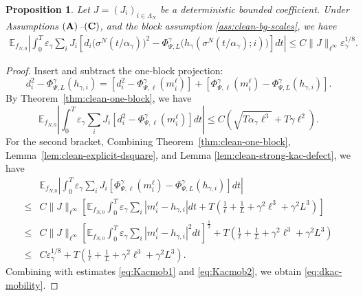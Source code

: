 \documentclass{article}
\newtheorem{proposition}[theorem]{Proposition}
\begin{document}
\begin{proposition}
\label{prop:deterministic-microscopic-to-kac-mobility-main}
Let \(J=(J_i)_{i\in\Lambda_N}\) be a deterministic bounded coefficient. 
Under Assumptions \(({\bf A})\)--\(({\bf C})\), and the block assumption \eqref{ass:clean-bg-scales}, we have
\begin{align}\label{eq:dkac-mobility}
    \mathbb E_{f_{N,0}} \left|\int_0^T \varepsilon_\gamma\sum_i
J_i\left[d_i\bigl(\sigma^N(t/\alpha_\gamma)\bigr)^2 - \Phi_{\Psi,L}^{\gamma}
\bigl(h_\gamma(\sigma^N(t/\alpha_\gamma);i)\bigr)\right]dt \right| \le C\|J\|_{\ell^\infty}\varepsilon^{1/8}_{\gamma}.
\end{align}
\end{proposition}

\begin{proof}
Insert and subtract the one-block projection:
\[
 d_i^2-
\Phi_{\Psi,L}^{\gamma}(h_{\gamma,i})
=
\left[d_i^2-\Phi_{\Psi,\ell}^{\gamma}(m_i^\ell)\right]
+
\left[
\Phi_{\Psi,\ell}^{\gamma}(m_i^\ell)
-
\Phi_{\Psi,L}^{\gamma}(h_{\gamma,i})
\right].
\]
By Theorem~\ref{thm:clean-one-block}, we have
\begin{equation}\label{eq:Kacmob1}
    \mathbb E_{f_{N,0}}\left|\int_0^T
\varepsilon_\gamma\sum_i
J_i\left[ d_i^2-
\Phi_{\Psi,\ell}^{\gamma}(m_i^\ell)\right]dt\right| \le C\left(\sqrt{T\alpha_\gamma\ell^3}
+T\gamma\ell^2\right).
\end{equation}
For the second bracket, Combining Theorem~\ref{thm:clean-one-block}, Lemma~\ref{lem:clean-explicit-dsquare}, and Lemma \ref{lem:clean-strong-kac-defect}, we have
\begin{align}\label{eq:Kacmob2}
&  \mathbb E_{f_{N,0}}\left|\int_0^T\varepsilon_\gamma\sum_i J_i\left[ \Phi_{\Psi,\ell}^{\gamma}(m_i^\ell)
-
\Phi_{\Psi,L}^{\gamma}(h_{\gamma,i})\right]dt\right| \nonumber \\
    \le & C\|J\|_{\ell^\infty}
\left[\mathbb E_{f_{N,0}}
\int_0^T \varepsilon_\gamma\sum_i|m_i^\ell-h_{\gamma,i}|dt +T\left(\frac1\ell+\frac1L+\gamma^2\ell^3+\gamma^2L^3\right)\right] \nonumber \\
\le & C\|J\|_{\ell^\infty}
\left[\mathbb E_{f_{N,0}}
\int_0^T \varepsilon_\gamma\sum_i|m_i^\ell-h_{\gamma,i}|^2dt \right]^{\frac{1}{2}}+T\left(\frac1\ell+\frac1L+\gamma^2\ell^3+\gamma^2L^3\right) \nonumber\\
\le & C \varepsilon^{1/8}_{\gamma}+T\left(\frac1\ell+\frac1L+\gamma^2\ell^3+\gamma^2L^3\right).
\end{align}
Combining with estimates \eqref{eq:Kacmob1} and \eqref{eq:Kacmob2}, we obtain \eqref{eq:dkac-mobility}.
\end{proof}
\end{document}
